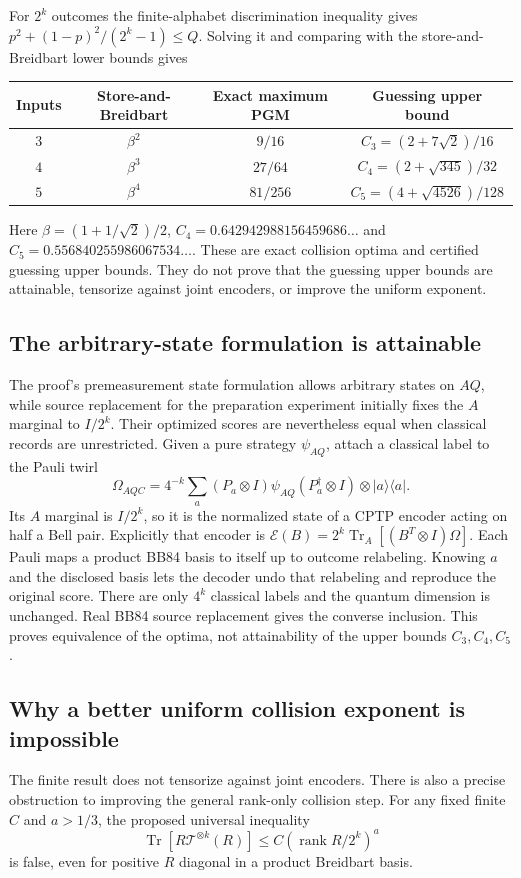 \documentclass[11pt,a4paper]{article}
\newcommand{\Tr}{\operatorname{Tr}}
\newcommand{\rank}{\operatorname{rank}}
\newcommand{\ket}[1]{\lvert #1\rangle}
\newcommand{\bra}[1]{\langle #1\rvert}
\begin{document}
For $2^k$ outcomes the finite-alphabet discrimination inequality gives
$p^2+(1-p)^2/(2^k-1)\le Q$. Solving it and comparing with the store-and-Breidbart lower bounds gives
\begin{center}
\begin{tabular}{@{}cccc@{}}\toprule
Inputs & Store-and-Breidbart & Exact maximum PGM & Guessing upper bound\\\midrule
$3$ & $\beta^2$ & $9/16$ & $C_3=(2+7\sqrt2)/16$\\
$4$ & $\beta^3$ & $27/64$ & $C_4=(2+\sqrt{345})/32$\\
$5$ & $\beta^4$ & $81/256$ & $C_5=(4+\sqrt{4526})/128$\\\bottomrule
\end{tabular}
\end{center}
Here $\beta=(1+1/\sqrt2)/2$, $C_4=0.642942988156459686\ldots$ and $C_5=0.556840255986067534\ldots$. These are exact collision optima and certified guessing upper bounds. They do not prove that the guessing upper bounds are attainable, tensorize against joint encoders, or improve the uniform exponent.

\subsection{The arbitrary-state formulation is attainable}
The proof's premeasurement state formulation allows arbitrary states on $AQ$, while source replacement for the preparation experiment initially fixes the $A$ marginal to $I/2^k$. Their optimized scores are nevertheless equal when classical records are unrestricted. Given a pure strategy $\psi_{AQ}$, attach a classical label to the Pauli twirl
\[
\Omega_{AQC}=4^{-k}\sum_a(P_a\otimes I)\psi_{AQ}(P_a^\dagger\otimes I)
\otimes\ket a\bra a.
\]
Its $A$ marginal is $I/2^k$, so it is the normalized state of a CPTP encoder acting on half a Bell pair. Explicitly that encoder is $\mathcal E(B)=2^k\Tr_A[(B^T\otimes I)\Omega]$. Each Pauli maps a product BB84 basis to itself up to outcome relabeling. Knowing $a$ and the disclosed basis lets the decoder undo that relabeling and reproduce the original score. There are only $4^k$ classical labels and the quantum dimension is unchanged. Real BB84 source replacement gives the converse inclusion. This proves equivalence of the optima, not attainability of the upper bounds $C_3,C_4,C_5$.

\subsection{Why a better uniform collision exponent is impossible}
The finite result does not tensorize against joint encoders. There is also a precise obstruction to improving the general rank-only collision step. For any fixed finite $C$ and $a>1/3$, the proposed universal inequality
\[
\Tr[R\mathcal T^{\otimes k}(R)]\le C(\rank R/2^k)^a
\]
is false, even for positive $R$ diagonal in a product Breidbart basis.
\end{document}
